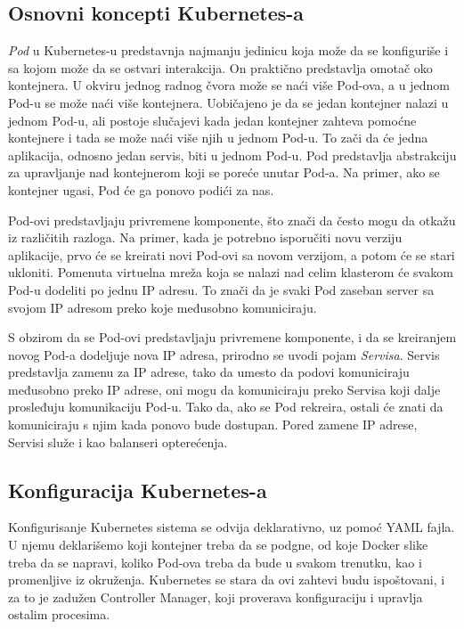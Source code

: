 \subsection{Osnovni koncepti Kubernetes-a}
{\em Pod} u Kubernetes-u predstavnja najmanju jedinicu koja može da se konfiguriše i sa kojom može da 
se ostvari interakcija. On praktično predstavlja omotač oko kontejnera. U okviru jednog radnog čvora 
može se naći više Pod-ova, a u jednom Pod-u se može naći više kontejnera. Uobičajeno je da se jedan 
kontejner nalazi u jednom Pod-u, ali postoje slučajevi kada jedan kontejner zahteva pomoćne kontejnere 
i tada se može naći više njih u jednom Pod-u. To zači da će jedna aplikacija, odnosno jedan servis, 
biti u jednom Pod-u. Pod predstavlja abstrakciju za upravljanje nad kontejnerom koji se poreće unutar
Pod-a. Na primer, ako se kontejner ugasi, Pod će ga ponovo podići za nas. 

Pod-ovi predstavljaju privremene komponente, što znači da često mogu da otkažu iz različitih razloga. 
Na primer, kada je potrebno isporučiti novu verziju aplikacije, prvo će se kreirati novi Pod-ovi sa 
novom verzijom, a potom će se stari ukloniti. Pomenuta virtuelna mreža koja se nalazi nad celim 
klasterom će svakom Pod-u dodeliti po jednu IP adresu. To znači da je svaki Pod zaseban server sa 
svojom IP adresom preko koje međusobno komuniciraju.

S obzirom da se Pod-ovi predstavljaju privremene komponente, i da se kreiranjem novog Pod-a dodeljuje 
nova IP adresa, prirodno se uvodi pojam {\em Servisa}. Servis predstavlja zamenu za IP adrese, tako 
da umesto da podovi komuniciraju međusobno preko IP adrese, oni mogu da komuniciraju preko Servisa 
koji dalje prosleđuju komunikaciju Pod-u. Tako da, ako se Pod rekreira, ostali će znati da komuniciraju 
s njim kada ponovo bude dostupan. Pored zamene IP adrese, Servisi služe i kao balanseri opterećenja. 

\subsection{Konfiguracija Kubernetes-a}
Konfigurisanje Kubernetes sistema se odvija deklarativno, uz pomoć YAML fajla. U njemu deklarišemo
koji kontejner treba da se podgne, od koje Docker slike treba da se napravi, koliko Pod-ova treba 
da bude u svakom trenutku, kao i promenljive iz okruženja. Kubernetes se stara da ovi zahtevi budu 
ispoštovani, i za to je zadužen Controller Manager, koji proverava konfiguraciju i upravlja ostalim 
procesima. 

